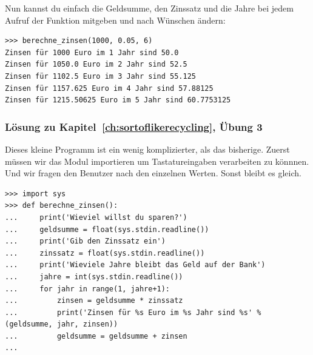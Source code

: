\noindent
Nun kannst du einfach die Geldsumme, den Zinssatz und die Jahre bei jedem Aufruf der Funktion mitgeben und nach Wünschen ändern:

\begin{Verbatim}[frame=single]
>>> berechne_zinsen(1000, 0.05, 6)
Zinsen für 1000 Euro im 1 Jahr sind 50.0
Zinsen für 1050.0 Euro im 2 Jahr sind 52.5
Zinsen für 1102.5 Euro im 3 Jahr sind 55.125
Zinsen für 1157.625 Euro im 4 Jahr sind 57.88125
Zinsen für 1215.50625 Euro im 5 Jahr sind 60.7753125
\end{Verbatim}


\noindent
\subsubsection{Lösung zu Kapitel~\ref{ch:sortoflikerecycling}, Übung 3}
Dieses kleine Programm ist ein wenig komplizierter, als das bisherige. Zuerst müssen wir das  Modul importieren um Tastatureingaben verarbeiten zu könnnen. Und wir fragen den Benutzer nach den einzelnen Werten. Sonst bleibt es gleich.

\begin{Verbatim}[frame=single]
>>> import sys
>>> def berechne_zinsen():
...     print('Wieviel willst du sparen?')
...     geldsumme = float(sys.stdin.readline())
...     print('Gib den Zinssatz ein')
...     zinssatz = float(sys.stdin.readline())
...     print('Wieviele Jahre bleibt das Geld auf der Bank')
...     jahre = int(sys.stdin.readline())
...     for jahr in range(1, jahre+1):
...         zinsen = geldsumme * zinssatz
...         print('Zinsen für %s Euro im %s Jahr sind %s' % (geldsumme, jahr, zinsen))
...         geldsumme = geldsumme + zinsen
...
\end{Verbatim}

